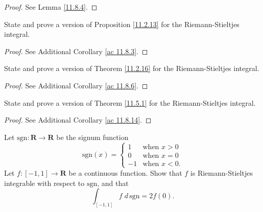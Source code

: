 \begin{proof}
    See Lemma \ref{11.8.4}.
\end{proof}

\begin{exercise}\label{ex 11.8.2}
    State and prove a version of Proposition \ref{11.2.13} for the Riemann-Stieltjes integral.
\end{exercise}

\begin{proof}
    See Additional Corollary \ref{ac 11.8.3}.
\end{proof}

\begin{exercise}\label{ex 11.8.3}
    State and prove a version of Theorem \ref{11.2.16} for the Riemann-Stieltjes integral.
\end{exercise}

\begin{proof}
    See Additional Corollary \ref{ac 11.8.6}.
\end{proof}

\begin{exercise}\label{ex 11.8.4}
    State and prove a version of Theorem \ref{11.5.1} for the Riemann-Stieltjes integral.
\end{exercise}

\begin{proof}
    See Additional Corollary \ref{ac 11.8.14}.
\end{proof}

\begin{exercise}\label{ex 11.8.5}
    Let \(\text{sgn} : \mathbf{R} \to \mathbf{R}\) be the signum function
    \[
        \text{sgn}(x) = \begin{cases}
            1  & \text{when } x > 0  \\
            0  & \text{when } x = 0  \\
            -1 & \text{when } x < 0.
        \end{cases}
    \]
    Let \(f : [-1, 1] \to \mathbf{R}\) be a continuous function.
    Show that \(f\) is Riemann-Stieltjes integrable with respect to \(\text{sgn}\), and that
    \[
        \int_{[-1, 1]} f \; d \, \text{sgn} = 2f(0).
    \]
\end{exercise}

